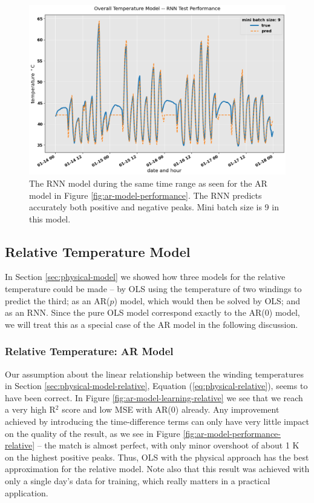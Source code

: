 \documentclass[]{article}
\begin{document}
\begin{figure}[!h]
	\centering
	\includegraphics[width=1\linewidth]{./figs/rnn-model-performance.png}
	\caption{The RNN model during the same time range as seen for the AR model in Figure \ref{fig:ar-model-performance}. The RNN predicts accurately both positive and negative peaks. Mini batch size is 9 in this model.}
	\label{fig:rnn-model-performance}
\end{figure}

\subsection{Relative Temperature Model} \label{sec:results-relative}
In Section \ref{sec:physical-model} we showed how three models for the relative temperature could be made -- by OLS using the temperature of two windings to predict the third; as an AR($p$) model, which would then be solved by OLS; and as an RNN. Since the pure OLS model correspond exactly to the AR($0$) model, we will treat this as a special case of the AR model in the following discussion.

\subsubsection{Relative Temperature: AR Model} \label{sec:results-relative-ar}
Our assumption about the linear relationship between the winding temperatures in Section \ref{sec:physical-model-relative}, Equation (\ref{eq:physical-relative}), seems to have been correct. In Figure \ref{fig:ar-model-learning-relative} we see that we reach a very high R$^2$ score and low MSE with AR($0$) already. Any improvement achieved by introducing the time-difference terms can only have very little impact on the quality of the result, as we see in Figure \ref{fig:ar-model-performance-relative} -- the match is almost perfect, with only minor overshoot of about 1 K on the highest positive peaks. Thus, OLS with the physical approach has the best approximation for the relative model. Note also that this result was achieved with only a single day's data for training, which really matters in a practical application.
\end{document}
